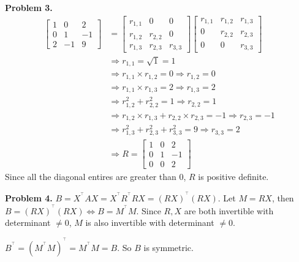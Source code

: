 \documentclass{article}
\begin{document}
\textbf{Problem 3.}
\begin{align}
    \begin{bmatrix}
        1 & 0 & 2 \\
        0 & 1 & -1 \\
        2 & -1 & 9
    \end{bmatrix} & =
    \begin{bmatrix}
        r_{1,1} & 0 & 0 \\
        r_{1,2} & r_{2,2} & 0 \\
        r_{1,3} & r_{2,3} & r_{3,3}
    \end{bmatrix}
    \begin{bmatrix}
        r_{1,1} & r_{1,2} & r_{1,3} \\
        0 & r_{2,2} & r_{2,3} \\
        0 & 0 & r_{3,3}
    \end{bmatrix} \nonumber \\
    & \Rightarrow r_{1,1} = \sqrt{1} = 1 \nonumber \\
    & \Rightarrow r_{1,1} \times r_{1,2} = 0 \Rightarrow r_{1,2} = 0 \nonumber \\
    & \Rightarrow r_{1,1} \times r_{1,3} = 2 \Rightarrow r_{1,3} = 2 \nonumber \\
    & \Rightarrow r_{1,2}^2 + r_{2,2}^2 = 1 \Rightarrow r_{2,2} = 1 \nonumber \\
    & \Rightarrow r_{1,2} \times r_{1,3} + r_{2,2} \times r_{2,3} = -1 \Rightarrow r_{2,3} = -1 \nonumber \\
    & \Rightarrow r_{1,3}^2 + r_{2,3}^2 + r_{3,3}^2 = 9 \Rightarrow r_{3,3} = 2 \nonumber \\
    & \Rightarrow R = \begin{bmatrix}
        1 & 0 & 2 \\
        0 & 1 & -1 \\
        0 & 0 & 2
    \end{bmatrix} \nonumber 
\end{align}
Since all the diagonal entires are greater than 0, $R$ is positive definite.
\bigbreak

\textbf{Problem 4.}
$B = X^{^\top}AX = X^{^\top}R^{^\top}RX = (RX)^{^\top}(RX)$. 
Let $M = RX$, then $B = (RX)^{^\top}(RX) \Leftrightarrow B = M^{^\top}M$. 
Since $R, X$ are both invertible with determinant $\neq 0$, $M$ is also invertible with determinant $\neq 0$.

$B^{^\top} = (M^{^\top}M)^{^\top} = M^{^\top}M = B$. So $B$ is symmetric.
\end{document}
